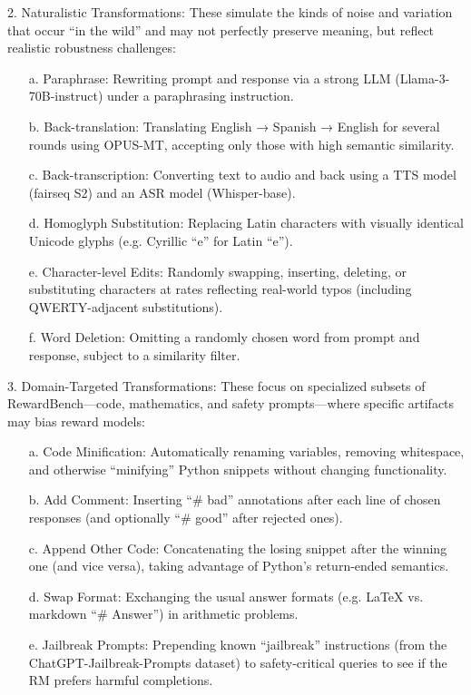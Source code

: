 \begin{tcolorbox}[azurebox]
2. Naturalistic Transformations: These simulate the kinds of noise and variation that occur ``in the wild'' and may not perfectly preserve meaning, but reflect realistic robustness challenges:
\begin{enumerate}
    \item[a.] Paraphrase: Rewriting prompt and response via a strong LLM (Llama-3-70B-instruct) under a paraphrasing instruction.
    \item[b.] Back-translation: Translating English → Spanish → English for several rounds using OPUS-MT, accepting only those with high semantic similarity.
    \item[c.]Back-transcription: Converting text to audio and back using a TTS model (fairseq S2) and an ASR model (Whisper-base).
    \item[d.] Homoglyph Substitution: Replacing Latin characters with visually identical Unicode glyphs (e.g. Cyrillic ``e'' for Latin ``e'').
    \item[e.] Character-level Edits: Randomly swapping, inserting, deleting, or substituting characters at rates reflecting real-world typos (including QWERTY-adjacent substitutions).
    \item[f.] Word Deletion: Omitting a randomly chosen word from prompt and response, subject to a similarity filter.
\end{enumerate}
\end{tcolorbox}
\begin{tcolorbox}[azurebox]
3. Domain-Targeted Transformations: These focus on specialized subsets of RewardBench—code, mathematics, and safety prompts—where specific artifacts may bias reward models:
\begin{enumerate}
    \item[a.] Code Minification: Automatically renaming variables, removing whitespace, and otherwise ``minifying'' Python snippets without changing functionality.
    \item[b.] Add Comment: Inserting ``\# bad'' annotations after each line of chosen responses (and optionally ``\# good'' after rejected ones).
    \item[c.] Append Other Code: Concatenating the losing snippet after the winning one (and vice versa), taking advantage of Python’s return-ended semantics.
    \item[d.] Swap Format: Exchanging the usual answer formats (e.g. LaTeX  vs. markdown ``\# Answer'') in arithmetic problems.
    \item[e.] Jailbreak Prompts: Prepending known ``jailbreak'' instructions (from the ChatGPT-Jailbreak-Prompts dataset) to safety-critical queries to see if the RM prefers harmful completions.
\end{enumerate}
\end{tcolorbox}
